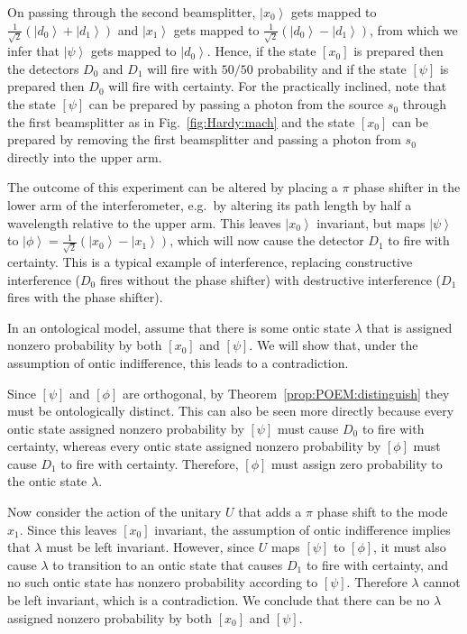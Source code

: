\documentclass[DIV=calc,paper=a4,fontsize=11pt,twocolumn]{scrartcl} %
\theoremstyle{definition}
\theoremstyle{plain}
\newcommand{\Ket}[1]{\ensuremath{\left \vert #1 \right \rangle}}
\newcommand{\Proj}[1]{\ensuremath{\left [ #1 \right ]}}
\begin{document}
On passing through the second beamsplitter, $\Ket{x_0}$ gets mapped to
$\frac{1}{\sqrt{2}} \left ( \Ket{d_0} + \Ket{d_1} \right )$ and
$\Ket{x_1}$ gets mapped to $\frac{1}{\sqrt{2}} \left ( \Ket{d_0} -
\Ket{d_1} \right )$, from which we infer that $\Ket{\psi}$ gets
mapped to $\Ket{d_0}$.  Hence, if the state $\Proj{x_0}$ is prepared
then the detectors $D_0$ and $D_1$ will fire with $50/50$ probability
and if the state $\Proj{\psi}$ is prepared then $D_0$ will fire with
certainty.  For the practically inclined, note that the state
$\Proj{\psi}$ can be prepared by passing a photon from the source
$s_0$ through the first beamsplitter as in Fig.~\ref{fig:Hardy:mach}
and the state $\Proj{x_0}$ can be prepared by removing the first
beamsplitter and passing a photon from $s_0$ directly into the upper
arm.

The outcome of this experiment can be altered by placing a $\pi$ phase
shifter in the lower arm of the interferometer, e.g.\ by altering its
path length by half a wavelength relative to the upper arm.  This
leaves $\Ket{x_0}$ invariant, but maps $\Ket{\psi}$ to $\Ket{\phi} =
\frac{1}{\sqrt{2}} \left ( \Ket{x_0} - \Ket{x_1} \right )$, which will
now cause the detector $D_1$ to fire with certainty.  This is a
typical example of interference, replacing constructive interference
($D_0$ fires without the phase shifter) with destructive interference
($D_1$ fires with the phase shifter).

In an ontological model, assume that there is some ontic state
$\lambda$ that is assigned nonzero probability by both $\Proj{x_0}$
and $\Proj{\psi}$.  We will show that, under the assumption of ontic
indifference, this leads to a contradiction.

Since $\Proj{\psi}$ and $\Proj{\phi}$ are orthogonal, by
Theorem~\ref{prop:POEM:distinguish} they must be ontologically
distinct.  This can also be seen more directly because every ontic
state assigned nonzero probability by $\Proj{\psi}$ must cause $D_0$
to fire with certainty, whereas every ontic state assigned nonzero
probability by $\Proj{\phi}$ must cause $D_1$ to fire with certainty.
Therefore, $\Proj{\phi}$ must assign zero probability to the ontic
state $\lambda$.

Now consider the action of the unitary $U$ that adds a $\pi$ phase
shift to the mode $x_1$.  Since this leaves $\Proj{x_0}$ invariant, the
assumption of ontic indifference implies that $\lambda$ must be left
invariant.  However, since $U$ maps $\Proj{\psi}$ to $\Proj{\phi}$, it
must also cause $\lambda$ to transition to an ontic state that causes
$D_1$ to fire with certainty, and no such ontic state has nonzero
probability according to $\Proj{\psi}$.  Therefore $\lambda$ cannot be
left invariant, which is a contradiction.  We conclude that there can
be no $\lambda$ assigned nonzero probability by both $\Proj{x_0}$ and
$\Proj{\psi}$.
\end{document}
